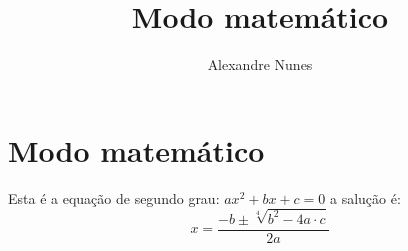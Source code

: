 \documentclass{article}
\begin{document}
	
	\title{\textbf{{\Huge Modo matemático}}} %
	\author{Alexandre Nunes} %
	\date{} %
	\maketitle %
	\thispagestyle{empty} %
	\newpage
	
	\setcounter{page}{1} %
	\tableofcontents %
	\newpage
	
	\listoffigures %
	\newpage
	
	\listoftables %
	\newpage

	\setcounter{page}{1} %
	
	\section{Modo matemático}
	
	Esta é a equação de segundo grau: $ ax^2 + bx + c = 0 $ a salução é:
	\begin{equation*}
		x = \frac{-b \pm \sqrt[4]{b^2 - 4a\cdot c}}{2a}
	\end{equation*}
	
	
	
\end{document}
